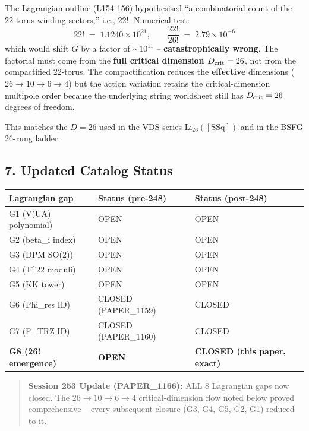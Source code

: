 \documentclass[
]{article}
\newcounter{none} %
\begin{document}
The Lagrangian outline
(\href{_lagrangian_rederivation_outline.py\#L154}{L154-156})
hypothesised ``a combinatorial count of the 22-torus winding sectors,''
i.e., \(22!\). Numerical test:
\[22! \;=\; 1.1240 \times 10^{21}, \qquad \frac{22!}{26!} \;=\; 2.79 \times 10^{-6}\]
which would shift \(G\) by a factor of \(\sim 10^{11}\) --
\textbf{catastrophically wrong}. The factorial must come from the
\textbf{full critical dimension \(D_{\rm crit}=26\)}, not from the
compactified 22-torus. The compactification reduces the
\textbf{effective} dimensions (\(26 \to 10 \to 6 \to 4\)) but the action
variation retains the critical-dimension multipole order because the
underlying string worldsheet still has \(D_{\rm crit}=26\) degrees of
freedom.

This matches the \(D=26\) used in the VDS series
\(\mathrm{Li}_{26}([\mathrm{SSq}])\) and in the BSFG 26-rung ladder.

\subsection{7. Updated Catalog Status}\label{updated-catalog-status}

{\def\LTcaptype{none} %
\begin{longtable}[]{@{}lll@{}}
\toprule\noalign{}
Lagrangian gap & Status (pre-248) & Status (post-248) \\
\midrule\noalign{}
\endhead
\bottomrule\noalign{}
\endlastfoot
G1 (V(UA) polynomial) & OPEN & OPEN \\
G2 (beta\_i index) & OPEN & OPEN \\
G3 (DPM SO(2)) & OPEN & OPEN \\
G4 (T\^{}22 moduli) & OPEN & OPEN \\
G5 (KK tower) & OPEN & OPEN \\
G6 (Phi\_res ID) & CLOSED (PAPER\_1159) & CLOSED \\
G7 (F\_TRZ ID) & CLOSED (PAPER\_1160) & CLOSED \\
\textbf{G8 (26! emergence)} & \textbf{OPEN} & \textbf{CLOSED (this
paper, exact)} \\
\end{longtable}
}

\begin{quote}
\textbf{Session 253 Update (PAPER\_1166):} ALL 8 Lagrangian gaps now
closed. The \(26 \to 10 \to 6 \to 4\) critical-dimension flow noted
below proved comprehensive -- every subsequent closure (G3, G4, G5, G2,
G1) reduced to it.
\end{quote}
\end{document}

